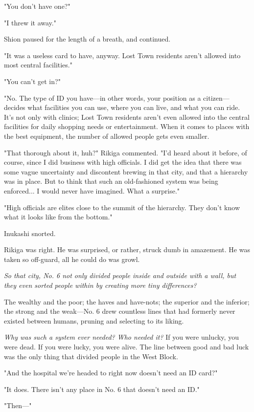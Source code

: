 "You don't have one?"

"I threw it away."

Shion paused for the length of a breath, and continued.

"It was a useless card to have, anyway. Lost Town residents aren't
allowed into most central facilities."

"You can't get in?"

"No. The type of ID you have---in other words, your position as a
citizen---decides what facilities you can use, where you can live, and
what you can ride. It's not only with clinics; Lost Town residents
aren't even allowed into the central facilities for daily shopping needs
or entertainment. When it comes to places with the best equipment, the
number of allowed people gets even smaller.

"That thorough about it, huh?" Rikiga commented. "I'd heard about it
before, of course, since I did business with high officials. I did get
the idea that there was some vague uncertainty and discontent brewing in
that city, and that a hierarchy was in place. But to think that such an
old-fashioned system was being enforced... I would never have imagined.
What a surprise."

"High officials are elites close to the summit of the hierarchy. They
don't know what it looks like from the bottom."

Inukashi snorted.

Rikiga was right. He was surprised, or rather, struck dumb in amazement.
He was taken so off-guard, all he could do was growl.

\emph{So that city, No. 6 not only divided people inside and outside with a
wall, but they even sorted people within by creating more tiny
differences?}

The wealthy and the poor; the haves and have-nots; the superior and the
inferior; the strong and the weak---No. 6 drew countless lines that had
formerly never existed between humans, pruning and selecting to its
liking.

\emph{Why was such a system ever needed? Who needed it?} If you were unlucky,
you were dead. If you were lucky, you were alive. The line between good
and bad luck was the only thing that divided people in the West Block.

"And the hospital we're headed to right now doesn't need an ID card?"

"It does. There isn't any place in No. 6 that doesn't need an ID."

"Then---"

